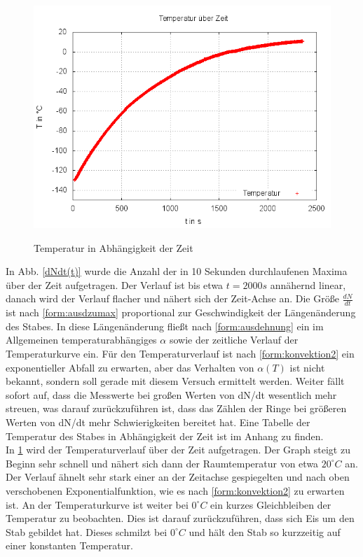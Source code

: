 \begin{figure}
\centering
	\includegraphics[width=.8\textwidth]{images/T(t).png}
\label{plot:Tt}
\caption{Temperatur in Abhängigkeit der Zeit}
\end{figure}

In Abb. \ref{dNdt(t)} wurde die Anzahl der in 10 Sekunden durchlaufenen Maxima über der Zeit aufgetragen. Der Verlauf
ist bis etwa $ t = 2000 s$ annähernd linear, danach wird der Verlauf flacher und nähert sich der Zeit-Achse an. Die Größe
$ \frac{dN}{dt} $ ist nach \ref{form:ausdzumax} proportional zur Geschwindigkeit der Längenänderung des Stabes. In diese
Längenänderung fließt nach \ref{form:ausdehnung} ein im Allgemeinen temperaturabhängiges $ \alpha $ sowie der zeitliche 
Verlauf der Temperaturkurve ein. Für den Temperaturverlauf ist nach \ref{form:konvektion2} ein exponentieller Abfall
zu erwarten, aber das Verhalten von $ \alpha(T) $ ist nicht bekannt, sondern soll gerade mit diesem Versuch ermittelt werden. 
Weiter fällt sofort auf, dass die Messwerte bei großen Werten von dN/dt wesentlich
mehr streuen, was darauf zurückzuführen ist, dass das Zählen der Ringe bei größeren Werten von dN/dt mehr 
Schwierigkeiten bereitet hat.
Eine Tabelle der Temperatur des Stabes in Abhängigkeit der Zeit ist im Anhang zu finden. \\





In \ref{plot:Tt} wird der Temperaturverlauf über der Zeit aufgetragen. Der Graph steigt zu Beginn sehr schnell und nähert
sich dann der Raumtemperatur von etwa $ 20 ^{\circ} C $ an. Der Verlauf ähnelt sehr stark einer an der Zeitachse 
gespiegelten und nach oben verschobenen Exponentialfunktion, wie es nach \ref{form:konvektion2} zu erwarten ist. 
An der Temperaturkurve ist weiter bei $ 0 ^{\circ} C $ ein kurzes Gleichbleiben der Temperatur zu beobachten. Dies ist darauf zurückzuführen, dass sich Eis um den Stab gebildet hat. Dieses schmilzt bei $ 0 ^{\circ} C $ und hält den Stab so kurzzeitig auf einer konstanten Temperatur.

